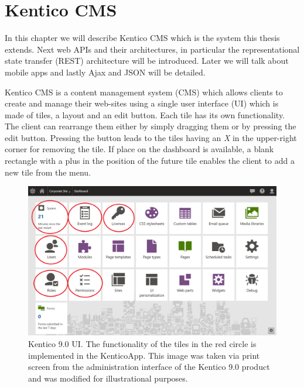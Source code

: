 \section{Kentico CMS} \label{analysisKenticoCMS}
In this chapter we will describe Kentico CMS which is the system this thesis extends. Next web APIs and their architectures, in particular the representational state transfer (REST) architecture will be introduced. Later we will talk about mobile apps and lastly Ajax and JSON will be detailed. 

Kentico CMS \cite{kentico-product-overview} is a content management system (CMS) which allows clients to create and manage their web-sites using a single user interface (UI) which is made of tiles, a layout and an edit button. Each tile has its own functionality. The client can rearrange them either by simply dragging them or by pressing the edit button. Pressing the button leads to the tiles having an \textit{X} in the upper-right corner for removing the tile. If place on the dashboard is available, a blank rectangle with a plus in the position of the future tile enables the client to add a new tile from the menu. 

\begin{figure}[ht!]
  \centering
  \includegraphics[width=\textwidth]{Images/Kentico9.png}
  \caption{Kentico 9.0 UI. The functionality of the tiles in the red circle is implemented in the KenticoApp. This image was
taken via print screen from the administration interface of the Kentico 9.0 product and was modified for illustrational purposes.}
  \label{kentico9UI}
\end{figure} 

